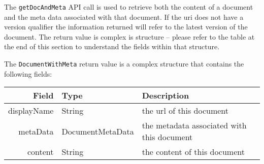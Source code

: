 The \verb+getDocAndMeta+ API call is used to retrieve both the content of
a document and the meta data associated with that document. If the uri does
not have a version qualifier the information returned will refer to the latest
version of the document. The return value is complex is structure -- please
refer to the table at the end of this section to understand the fields within that
structure.

The \verb+DocumentWithMeta+ return value is a complex structure that contains
the following fields:

\begin{table}[H]
  \small
\begin{center}
\begin{tabular}{rl p{7cm}}
  Field & Type & Description \\
  \hline
  displayName & String & the url of this document \\
  metaData & DocumentMetaData & the metadata associated with this document \\
  content & String & the content of this document \\
\end{tabular}
\end{center}
\end{table}
